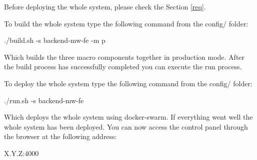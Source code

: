 Before deploying the whole system, please check the Section \ref{req}.

To build the whole system type the following command from the config/ folder:

./build.sh -s backend-mw-fe -m p

Which builds the three macro components together in production mode.
After the build process has successfully completed you can execute the run
process.

To deploy the whole system type the following command from the config/ folder:

./run.sh -s backend-mw-fe

Which deploys the whole system using docker-swarm.
If everything went well the whole system has been deployed.
You can now access the control panel through the browser at the following
address:

X.Y.Z:4000
